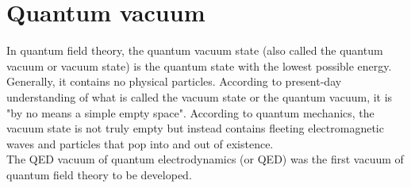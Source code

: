 \section{Quantum vacuum}
In quantum field theory, the quantum vacuum state (also called the quantum vacuum or vacuum state) is the quantum state with the lowest possible energy. Generally, it contains no physical particles. According to present-day understanding of what is called the vacuum state or the quantum vacuum, it is "by no means a simple empty space". According to quantum mechanics, the vacuum state is not truly empty but instead contains fleeting electromagnetic waves and particles that pop into and out of existence.\\
The QED vacuum of quantum electrodynamics (or QED) was the first vacuum of quantum field theory to be developed. \\
\\
